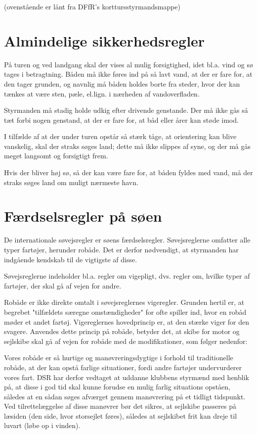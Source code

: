 \documentclass{article}
\begin{document}
(ovenstående er lånt fra DFfR's korttursstyrmandsmappe)

\section{Almindelige sikkerhedsregler}

På turen og ved landgang skal der vises al mulig forsigtighed, idet bl.a.
vind og sø tages i betragtning. Båden må ikke føres ind på så lavt vand,
at der er fare for, at den tager grunden, og navnlig må båden holdes
borte fra steder, hvor der kan tænkes at være sten, pæle, el.lign. i
nærheden af vandoverfladen.

Styrmanden må stadig holde udkig efter drivende genstande. Der må ikke
gås så tæt forbi nogen genstand, at der er fare for, at båd eller årer
kan støde imod.

I tilfælde af at der under turen opstår så stærk tåge, at orientering kan
blive vanskelig, skal der straks søges land; dette må ikke slippes af
syne, og der må gås meget langsomt og forsigtigt frem.

Hvis der bliver høj sø, så der kan være fare for, at båden fyldes med
vand, må der straks søges land om muligt nærmeste havn.

\section{Færdselsregler på søen}

De internationale søvejsregler er søens færdselsregler. Søvejsreglerne
omfatter alle typer fartøjer, herunder robåde. Det er derfor nødvendigt,
at styrmanden har indgående kendskab til de vigtigste af disse.

Søvejsreglerne indeholder bl.a. regler om vigepligt, dvs. regler om,
hvilke typer af fartøjer, der skal gå af
vejen for andre.

Robåde er ikke direkte omtalt i søvejsreglernes vigeregler. Grunden
hertil er, at begrebet "tilfældets særegne omstændigheder" for ofte
spiller ind, hvor en robåd møder et andet fartøj. Vigereglernes
hovedprincip er, at den stærke viger for den svagere. Anvendes dette
princip på robåde, betyder det, at skibe for motor og sejlskibe skal gå
af vejen for robåde med de modifikationer, som følger nedenfor:

Vores robåde er så hurtige og manøvreringsdygtige i forhold til
traditionelle robåde, at der kan opstå farlige situationer, fordi andre
fartøjer undervurderer vores fart. DSR har derfor vedtaget at uddanne
klubbens styrmænd med henblik på, at disse i god tid skal kunne forudse
en mulig farlig situations opståen, således at en sådan søges afværget
gennem manøvrering på et tidligt tidspunkt. Ved tilrettelæggelse af disse
manøvrer bør det sikres, at sejlskibe passeres på læsiden (den side, hvor
storsejlet føres), således at sejlskibet frit kan dreje til luvart (løbe
op i vinden).
\end{document}
